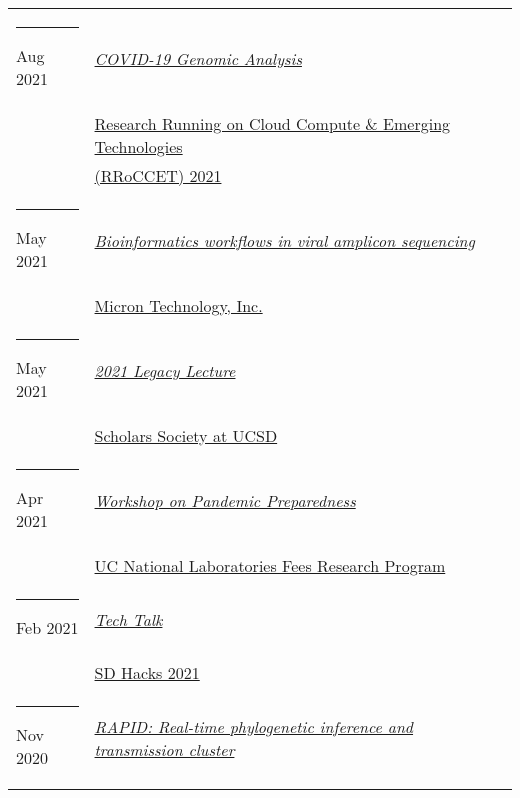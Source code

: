 \documentclass[margin,line]{res}
\begin{document}
\begin{resume}
\begin{longtable}{@{}p{0.7in}p{4in}}
\hspace*{-4mm} \rule{-1mm}{5mm} Aug 2021 & \href{https://na.eventscloud.com/website/23042/}{\textit{COVID-19 Genomic Analysis}}\\*
\hspace*{-4mm} & \hspace{4mm} \href{https://na.eventscloud.com/website/23042/}{Research Running on Cloud Compute \& Emerging Technologies}\\*
\hspace*{-4mm} & \hspace{4mm} \href{https://na.eventscloud.com/website/23042/}{(RRoCCET) 2021}\\
\hspace*{-4mm} \rule{-1mm}{5mm} May 2021 & \href{https://www.micron.com/}{\textit{Bioinformatics workflows in viral amplicon sequencing}}\\*
\hspace*{-4mm} & \hspace{4mm} \href{https://www.micron.com/}{Micron Technology, Inc.}\\
\hspace*{-4mm} \rule{-1mm}{5mm} May 2021 & \href{https://studentorg.ucsd.edu/Home/Details/12340}{\textit{2021 Legacy Lecture}}\\*
\hspace*{-4mm} & \hspace{4mm} \href{https://studentorg.ucsd.edu/Home/Details/12340}{Scholars Society at UCSD}\\
\hspace*{-4mm} \rule{-1mm}{5mm} Apr 2021 & \href{https://www.ucop.edu/research-initiatives/programs/lab-fees/workshops.html}{\textit{Workshop on Pandemic Preparedness}}\\*
\hspace*{-4mm} & \hspace{4mm} \href{https://www.ucop.edu/research-initiatives/programs/lab-fees/index.html}{UC National Laboratories Fees Research Program}\\
\hspace*{-4mm} \rule{-1mm}{5mm} Feb 2021 & \href{https://www.sdhacks.io/}{\textit{Tech Talk}}\\*
\hspace*{-4mm} & \hspace{4mm} \href{https://www.sdhacks.io/}{SD Hacks 2021}\\
\hspace*{-4mm} \rule{-1mm}{5mm} Nov 2020 & \href{https://www.youtube.com/watch?v=6-fDbTY8ySI}{\textit{RAPID: Real-time phylogenetic inference and transmission cluster}}\\*

\end{longtable}
\end{resume}
\end{document}
